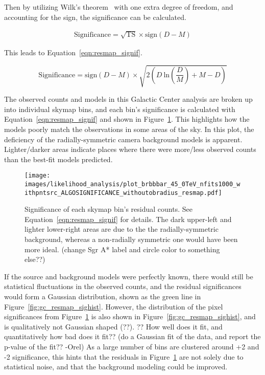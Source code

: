   Then by utilizing Wilk's theorem~\cite{wilks1938} with one extra degree of freedom, and accounting for the sign, the significance can be calculated.
    
  \begin{equation}
    \begin{split}
      \textrm{Significance} = \sqrt{\textrm{TS}} \times \textrm{sign} \left ( D - M \right )
    \end{split}
  \end{equation}
  
  This leads to Equation~\ref{eqn:resmap_signif}.
  
  \begin{equation}\label{eqn:resmap_signif}
    \textrm{Significance} = \textrm{sign}(D-M) \times \sqrt{ 2 \left ( D \: \textrm{ln} \left ( \frac{D}{M} \right ) + M - D \right ) }
  \end{equation}

  The observed counts and models in this Galactic Center analysis are broken up into individual skymap bins, and each bin's significance is calculated with Equation~\ref{eqn:resmap_signif} and shown in Figure~\ref{fig:gc_resmap}.
  This highlights how the models poorly match the observations in some areas of the sky.
  In this plot, the deficiency of the radially-symmetric camera background models is apparent.
  Lighter/darker areas indicate places where there were more/less observed counts than the best-fit models predicted.
  
  \begin{figure}[ht]
    \centering
    \texttt{[image: images/likelihood\_analysis/plot\_brbbbar\_45\_0TeV\_nfits1000\_withpntsrc\_ALGOSIGNIFICANCE\_withoutobradius\_resmap.pdf]}
    \caption[Galactic Center Residual Map]
    {
      Significance of each skymap bin's residual counts.
      See Equation~\ref{eqn:resmap_signif} for details.
      The dark upper-left and lighter lower-right areas are due to the the radially-symmetric background, whereas a non-radially symmetric one would have been more ideal.
      {\color{red}(change Sgr A* label and circle color to something else??)}
    }
    \label{fig:gc_resmap}
  \end{figure}
  
  If the source and background models were perfectly known, there would still be statistical fluctuations in the observed counts, and the residual significances would form a Gaussian distribution, shown as the green line in Figure~\ref{fig:gc_resmap_sighist}.
  However, the distribution of the pixel significances from Figure~\ref{fig:gc_resmap} is also shown in Figure~\ref{fig:gc_resmap_sighist}, and is qualitatively not Gaussian shaped {\color{red}(??)}.
  {\color{red}?? How well does it fit, and quantitatively how bad does it fit??}
  {\color{red}(do a Gaussian fit of the data, and report the p-value of the fit?? -Orel)}
  As a large number of bins are clustered around +2 and -2 significance, this hints that the residuals in Figure~\ref{fig:gc_resmap} are not solely due to statistical noise, and that the background modeling could be improved.
  
